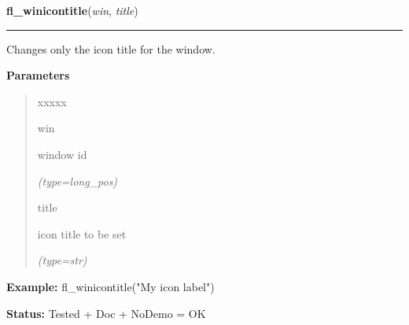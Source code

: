 \hspace{.8\funcindent}\begin{boxedminipage}{\funcwidth}

    \raggedright \textbf{fl\_winicontitle}(\textit{win}, \textit{title})

    \vspace{-1.5ex}

    \rule{\textwidth}{0.5\fboxrule}
\setlength{\parskip}{2ex}
    Changes only the icon title for the window.

\setlength{\parskip}{1ex}
      \textbf{Parameters}
      \vspace{-1ex}

      \begin{quote}
        \begin{Ventry}{xxxxx}

          \item[win]

          window id

            {\it (type=long\_pos)}

          \item[title]

          icon title to be set

            {\it (type=str)}

        \end{Ventry}

      \end{quote}

\textbf{Example:} fl\_winicontitle("My icon label")



\textbf{Status:} Tested + Doc + NoDemo = OK



    \end{boxedminipage}

    \label{xformslib:flxbasic:fl_winposition}

    \vspace{0.5ex}


